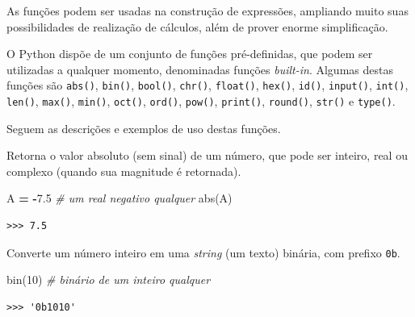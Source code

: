 \documentclass[
]{book}
\newenvironment{Shaded}{\begin{snugshade}}{\end{snugshade}}
\newcommand{\BuiltInTok}[1]{#1}
\newcommand{\CommentTok}[1]{\textcolor[rgb]{0.56,0.35,0.01}{\textit{#1}}}
\newcommand{\DecValTok}[1]{\textcolor[rgb]{0.00,0.00,0.81}{#1}}
\newcommand{\FloatTok}[1]{\textcolor[rgb]{0.00,0.00,0.81}{#1}}
\newcommand{\NormalTok}[1]{#1}
\newcommand{\OperatorTok}[1]{\textcolor[rgb]{0.81,0.36,0.00}{\textbf{#1}}}
\providecommand{\tightlist}{%
  \setlength{\itemsep}{0pt}\setlength{\parskip}{0pt}}
\begin{document}
As funções podem ser usadas na construção de expressões, ampliando muito suas possibilidades de realização de cálculos, além de prover enorme simplificação.

O Python dispõe de um conjunto de funções pré-definidas, que podem ser utilizadas a qualquer momento, denominadas funções \emph{built-in}. Algumas destas funções são \texttt{abs()}, \texttt{bin()}, \texttt{bool()}, \texttt{chr()}, \texttt{float()}, \texttt{hex()}, \texttt{id()}, \texttt{input()}, \texttt{int()}, \texttt{len()}, \texttt{max()}, \texttt{min()}, \texttt{oct()}, \texttt{ord()}, \texttt{pow()}, \texttt{print()}, \texttt{round()}, \texttt{str()} e \texttt{type()}.

Seguem as descrições e exemplos de uso destas funções.

\begin{description}
\tightlist
\item[\texttt{abs(x)}]
Retorna o valor absoluto (sem sinal) de um número, que pode ser inteiro, real ou complexo (quando sua magnitude é retornada).
\end{description}

\begin{Shaded}
\begin{Highlighting}[]
\NormalTok{A }\OperatorTok{=} \OperatorTok{{-}}\FloatTok{7.5} \CommentTok{\# um real negativo qualquer}
\BuiltInTok{abs}\NormalTok{(A)}
\end{Highlighting}
\end{Shaded}

\begin{verbatim}
>>> 7.5
\end{verbatim}

\begin{description}
\tightlist
\item[\texttt{bin(x)}]
Converte um número inteiro em uma \emph{string} (um texto) binária, com prefixo \texttt{0b}.
\end{description}

\begin{Shaded}
\begin{Highlighting}[]
\BuiltInTok{bin}\NormalTok{(}\DecValTok{10}\NormalTok{) }\CommentTok{\# binário de um inteiro qualquer}
\end{Highlighting}
\end{Shaded}

\begin{verbatim}
>>> '0b1010'
\end{verbatim}
\end{document}
